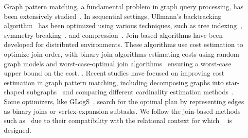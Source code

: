  Graph pattern matching, a fundamental problem in graph query processing, has been extensively studied~\cite{angles2017foundations}. In sequential settings, Ullmann's backtracking algorithm~\cite{ullmann1976algorithm} has been optimized using various techniques, such as tree indexing~\cite{shang2008quicksi}, symmetry breaking~\cite{han13turbo}, and compression~\cite{bi2016efficient}. 
Join-based algorithms have been developed for distributed environments. These algorithms use cost estimation to optimize join order, with binary-join algorithms\cite{lai2015scalable, lai2019distributed} estimating costs using random graph models and worst-case-optimal join algorithms~\cite{ammar2018distributed} ensuring a worst-case upper bound on the cost. . 
Recent studies have focused on improving cost estimation in graph pattern matching, including decomposing graphs into star-shaped subgraphs~\cite{cset} and comparing different cardinality estimation methods~\cite{gcare}. Some optimizers, like GLogS~\cite{GLogS}, search for the optimal plan by representing edges as binary joins or vertex-expansion subtasks. %
We follow the join-based methods such as~\cite{huge,GLogS} due to their compatibility with the relational context for which \name~ is designed. %


